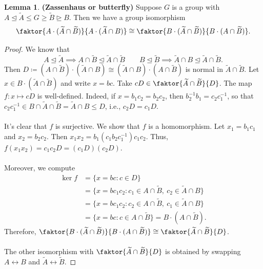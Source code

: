 \documentclass[10pt,letterpaper,cm]{nupset}
\theoremstyle{definition}
\newtheorem{lemma}{Lemma}
\newcommand{\1}{\mathbf{1}}
\newcommand{\0}{\vec 0}
\begin{document}
\begin{lemma}{\textbf{(Zassenhaus or butterfly)}}
Suppose $G$ is a group with $A \unlhd \widetilde{A} \leq G \geq \widetilde{B} \unrhd B$. Then we have a group isomorphism $$\faktor{A\cdot (\widetilde{A} \cap \widetilde{B})}{A \cdot (\widetilde{A} \cap B)} \cong \faktor{B \cdot (\widetilde{A} \cap \widetilde{B})}{B\cdot (A \cap \widetilde{B})}.$$
\end{lemma}
\begin{proof}
We know that $$A \unlhd \widetilde{A} \implies A \cap \widetilde{B} \unlhd \widetilde{A} \cap \widetilde{B} \quad \quad B \unlhd \widetilde{B} \implies \widetilde{A} \cap B \unlhd \widetilde{A} \cap \widetilde{B}.$$ 
Then $D\coloneqq  ({A} \cap \widetilde{B}) \cdot (\widetilde{A} \cap {B}) \cong  (\widetilde{A} \cap {B}) \cdot ({A} \cap \widetilde{B})$ is normal in $\widetilde{A} \cap \widetilde{B}$. Let $x \in B \cdot ( \widetilde{A} \cap \widetilde{B})$ and write $x = bc$. Take $cD \in \faktor{\widetilde{A} \cap \widetilde{B}}{D}$. The map $f: x \mapsto cD$ is well-defined. Indeed, if $x = b_1c_2 = b_2c_2$, then $b_2^{-1}b_1 = c_2c_1^{-1}$, so that $c_2c_1^{-1} \in B \cap \widetilde{A} \cap \widetilde{B} = \widetilde{A}\cap B \leq D$, i.e., $c_2D = c_1D$.
\\ \\It's clear that $f$ is surjective. We show that $f$ is a homomorphism. Let $x_1= b_1c_1$ and $x_2 = b_2c_2$. Then $x_1x_2 = b_1(c_1b_2c_1^{-1})c_1c_2$. Thus, $f(x_1x_2) = c_1c_2D = (c_1D)(c_2D)$.
\\ \\
Moreover, we compute 
\begin{align*} 
\ker f &= \{x = bc : c \in D\}  
\\ & = \{ x= bc_1c_2 : c_1\in {A} \cap \widetilde{B}, \  c_2 \in \widetilde{A} \cap {B}\}
\\ & = \{ x= bc_1c_2 : c_2\in {A} \cap \widetilde{B}, \  c_1 \in \widetilde{A} \cap {B}\} 
\\ & = \{x = bc : c \in A \cap \widetilde{B}\} = B \cdot (A \cap \widetilde{B}).
\end{align*} Therefore, $\faktor{B \cdot ( \widetilde{A} \cap \widetilde{B})}{ B \cdot (A \cap \widetilde{B})} \cong \faktor{\widetilde{A} \cap \widetilde{B}}{D}$. 
\\ \\ The other isomorphism with $\faktor{\widetilde{A} \cap \widetilde{B}}{D}$ is obtained by swapping $A \longleftrightarrow B$ and $\widetilde{A} \longleftrightarrow \widetilde{B}$.
\end{proof}
\end{document}
